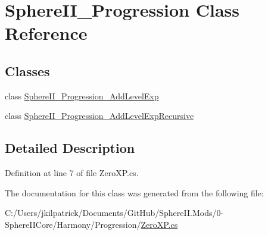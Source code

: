 \hypertarget{class_sphere_i_i___progression}{}\section{Sphere\+I\+I\+\_\+\+Progression Class Reference}
\label{class_sphere_i_i___progression}
\subsection*{Classes}
\begin{DoxyCompactItemize}
\item 
class \mbox{\hyperlink{class_sphere_i_i___progression_1_1_sphere_i_i___progression___add_level_exp}{Sphere\+I\+I\+\_\+\+Progression\+\_\+\+Add\+Level\+Exp}}
\item 
class \mbox{\hyperlink{class_sphere_i_i___progression_1_1_sphere_i_i___progression___add_level_exp_recursive}{Sphere\+I\+I\+\_\+\+Progression\+\_\+\+Add\+Level\+Exp\+Recursive}}
\end{DoxyCompactItemize}


\subsection{Detailed Description}


Definition at line 7 of file Zero\+X\+P.\+cs.



The documentation for this class was generated from the following file\+:\begin{DoxyCompactItemize}
\item 
C\+:/\+Users/jkilpatrick/\+Documents/\+Git\+Hub/\+Sphere\+I\+I.\+Mods/0-\/\+Sphere\+I\+I\+Core/\+Harmony/\+Progression/\mbox{\hyperlink{_zero_x_p_8cs}{Zero\+X\+P.\+cs}}\end{DoxyCompactItemize}
